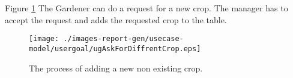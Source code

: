 Figure \ref{fig:lu.uni.lassy.excalibur.group01.excalibur-RE-UCD-ugAskForDiffrentCrop}
The Gardener can do a request for a new crop. The manager has to accept the 
request and adds the requested crop to the table.

\begin{figure}[htbp]
\begin{center}

\texttt{[image: ./images-report-gen/usecase-model/usergoal/ugAskForDiffrentCrop.eps]}
\end{center}
\caption[lu.uni.lassy.excalibur.group01.excalibur Use Case Diagram: ugAskForDiffrentCrop]{The process of adding a new non existing crop.}
\label{fig:lu.uni.lassy.excalibur.group01.excalibur-RE-UCD-ugAskForDiffrentCrop}
\end{figure}
\vspace{0.5cm}
